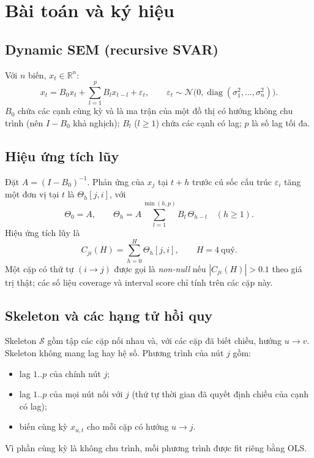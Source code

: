 \section{Bài toán và ký hiệu}\label{sec:bai-toan}

\subsection{Dynamic SEM (recursive SVAR)}
Với $n$ biến, $x_t\in\mathbb R^n$:
\begin{equation}
x_t = B_0 x_t + \sum_{l=1}^{p} B_l x_{t-l} + \varepsilon_t,\qquad \varepsilon_t\sim\mathcal N\bigl(0,\operatorname{diag}(\sigma_1^2,\dots,\sigma_n^2)\bigr).
\label{eq:svar}
\end{equation}
$B_0$ chứa các cạnh cùng kỳ và là ma trận của một đồ thị có hướng không chu trình (nên $I-B_0$ khả nghịch); $B_l$ ($l\ge1$) chứa các cạnh có lag; $p$ là số lag tối đa.

\subsection{Hiệu ứng tích lũy}
Đặt $A=(I-B_0)^{-1}$. Phản ứng của $x_j$ tại $t+h$ trước cú sốc cấu trúc $\varepsilon_i$ tăng một đơn vị tại $t$ là $\Theta_h[j,i]$, với
\begin{equation}
\Theta_0=A,\qquad \Theta_h = A\sum_{l=1}^{\min(h,p)} B_l\,\Theta_{h-l}\quad(h\ge1).
\label{eq:irf}
\end{equation}
Hiệu ứng tích lũy là
\begin{equation}
C_{ji}(H)=\sum_{h=0}^{H}\Theta_h[j,i],\qquad H=4\ \text{quý}.
\label{eq:cumulative}
\end{equation}
Một cặp có thứ tự $(i\to j)$ được gọi là \emph{non-null} nếu $|C_{ji}(H)|>0.1$ theo giá trị thật; các số liệu coverage và interval score chỉ tính trên các cặp này.

\subsection{Skeleton và các hạng tử hồi quy}
Skeleton $\mathcal S$ gồm tập các cặp nối nhau và, với các cặp đã biết chiều, hướng $u\to v$. Skeleton không mang lag hay hệ số. Phương trình của nút $j$ gồm:
\begin{itemize}
  \item lag $1..p$ của chính nút $j$;
  \item lag $1..p$ của mọi nút nối với $j$ (thứ tự thời gian đã quyết định chiều của cạnh có lag);
  \item biến cùng kỳ $x_{u,t}$ cho mỗi cặp có hướng $u\to j$.
\end{itemize}
Vì phần cùng kỳ là không chu trình, mỗi phương trình được fit riêng bằng OLS.

